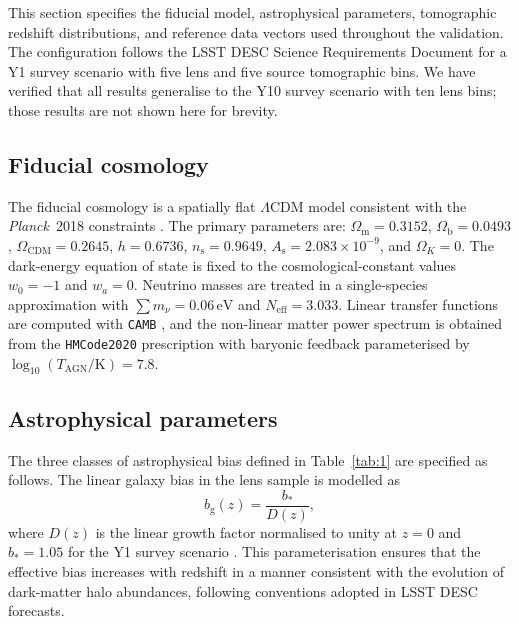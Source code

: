 This section specifies the fiducial model, astrophysical parameters, tomographic redshift distributions, and reference data vectors used throughout the validation. The configuration follows the LSST DESC Science Requirements Document \citep[SRD;][]{2009arXiv0912.0201L} for a Y1 survey scenario with five lens and five source tomographic bins. We have verified that all results generalise to the Y10 survey scenario with ten lens bins; those results are not shown here for brevity.

\subsection{Fiducial cosmology} \label{sec:3.1}

The fiducial cosmology is a spatially flat \(\Lambda\)CDM model consistent with the \textit{Planck}~2018 constraints \citep{2020A&A...641A...6P}. The primary parameters are: \(\Omega_{\mathrm{m}} = 0.3152\), \(\Omega_{\mathrm{b}} = 0.0493\), \(\Omega_{\mathrm{CDM}} = 0.2645\), \(h = 0.6736\), \(n_{\mathrm{s}} = 0.9649\), \(A_{\mathrm{s}} = 2.083 \times 10^{-9}\), and \(\Omega_K = 0\). The dark-energy equation of state is fixed to the cosmological-constant values \(w_0 = -1\) and \(w_a = 0\). Neutrino masses are treated in a single-species approximation with \(\sum m_\nu = 0.06\,\mathrm{eV}\) and \(N_{\mathrm{eff}} = 3.033\). Linear transfer functions are computed with \texttt{CAMB} \citep{2000ApJ...538..473L}, and the non-linear matter power spectrum is obtained from the \texttt{HMCode2020} prescription \citep{2021MNRAS.502.1401M} with baryonic feedback parameterised by \(\log_{10}(T_{\mathrm{AGN}}/\mathrm{K}) = 7.8\).

\subsection{Astrophysical parameters} \label{sec:3.2}

The three classes of astrophysical bias defined in Table~\ref{tab:1} are specified as follows. The linear galaxy bias in the lens sample is modelled as
\begin{equation} \label{eq:3.1}
    b_{\mathrm{g}}(z) = \frac{b_\ast}{D(z)},
\end{equation}
where \(D(z)\) is the linear growth factor normalised to unity at \(z = 0\) and \(b_\ast = 1.05\) for the Y1 survey scenario \citep{2018PhR...733....1D}. This parameterisation ensures that the effective bias increases with redshift in a manner consistent with the evolution of dark-matter halo abundances, following conventions adopted in LSST DESC forecasts.


